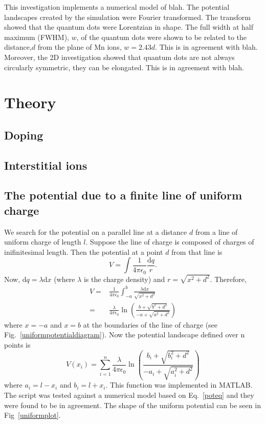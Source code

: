\message{ !name(report.tex)}\documentclass[]{article}
\begin{document}
This investigation implements a numerical model of blah. The potential landscapes created by the simulation were Fourier transformed. The transform showed that the quantum dots were Lorentzian in shape. The full width at half maximum (FWHM), $w$, of the quantum dots were shown to be related to the distance,$d$ from the plane of Mn ions, $w = 2.43d$. This is in agreement with blah. Moreover, the 2D investigation showed that quantum dots are not always circularly symmetric, they can be elongated. This is in agreement with blah. 

\section{Theory}

\subsection{Doping}

\subsection{Interstitial ions}

\subsection{The potential due to a finite line of uniform charge}
We search for the potential on a parallel line at a distance $d$ from a line of uniform charge of length $l$. Suppose the line of charge is composed of charges of inifinitesimal length. Then the potential at a point $d$ from that line is
\begin{equation}
V = \int \frac{1}{4\pi\epsilon_0}\frac{\text{d}q}{r}.
\end{equation}
Now, $\text{d}q = \lambda\text{d}x$ (where $\lambda$ is the charge density) and $r = \sqrt{x^2 + d^2}$. Therefore,
\begin{align}
V = & \frac{1}{4\pi\epsilon_0} \int_{-a}^{b}\frac{\lambda \text{d}x}{\sqrt{x^2+d^2}}\\
= & \frac{\lambda}{4\pi\epsilon_0} \ln \left(\frac{b+\sqrt{b^2+d^2}}{-a+\sqrt{a^2+d^2}}\right)
\end{align}
where $x = -a$ and $x = b$ at the boundaries of the line of charge (see Fig.~\ref{uniformpotentialdiagram}). Now the potential landscape defined over n points is
\begin{equation}\label{uniformeq1d}
V(x_i) = \sum_{i=1}^n\frac{\lambda}{4\pi\epsilon_0} \ln \left(\frac{b_i+\sqrt{b_i^2+d^2}}{-a_i+\sqrt{a_i^2+d^2}}\right)
\end{equation}
where $a_i = l - x_i$ and $b_i = l + x_i$. This function was implemented in MATLAB. The script was tested against a numerical model based on Eq.~\ref{poteq} and they were found to be in agreement. The shape of the uniform potential can be seen in Fig~\ref{uniformplot}.
\end{document}
